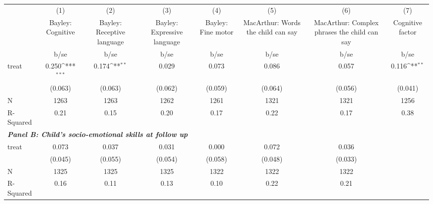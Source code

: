 {
\def\sym#1{\ifmmode^{#1}\else\(^{#1}\)\fi}
\begin{tabular}{l*{7}{c}}
\hline\hline
&\multicolumn{1}{c}{(1)}&\multicolumn{1}{c}{(2)}&\multicolumn{1}{c}{(3)}&\multicolumn{1}{c}{(4)}&\multicolumn{1}{c}{(5)}&\multicolumn{1}{c}{(6)}&\multicolumn{1}{c}{(7)}\\
&\multicolumn{1}{c}{Bayley: Cognitive}&\multicolumn{1}{c}{Bayley: Receptive language}&\multicolumn{1}{c}{Bayley: Expressive language}&\multicolumn{1}{c}{Bayley: Fine motor}&\multicolumn{1}{c}{MacArthur: Words the child can say}&\multicolumn{1}{c}{MacArthur: Complex phrases the child can say}&\multicolumn{1}{c}{Cognitive factor}\\
&        b/se         &        b/se         &        b/se         &        b/se         &        b/se         &        b/se         &        b/se         \\
\hline
treat               &       0.250\sym{***}&       0.174\sym{**} &       0.029         &       0.073         &       0.086         &       0.057         &       0.116\sym{**} \\
&     (0.063)         &     (0.063)         &     (0.062)         &     (0.059)         &     (0.064)         &     (0.056)         &     (0.041)         \\
\hline
N                   &        1263         &        1263         &        1262         &        1261         &        1321         &        1321         &        1256         \\
R-Squared           &        0.21         &        0.15         &        0.20         &        0.17         &        0.22         &        0.17         &        0.38         \\
\hline
\multicolumn{6}{l}{\linebreak \textbf{\textit{Panel B: Child's socio-emotional skills at follow up}}} \\
treat               &       0.073         &       0.037         &       0.031         &       0.000         &       0.072         &       0.036         \\
&     (0.045)         &     (0.055)         &     (0.054)         &     (0.058)         &     (0.048)         &     (0.033)         \\
\hline
N                   &        1325         &        1325         &        1325         &        1322         &        1322         &        1322         \\
R-Squared           &        0.16         &        0.11         &        0.13         &        0.10         &        0.22         &        0.21         \\

\end{tabular}}
